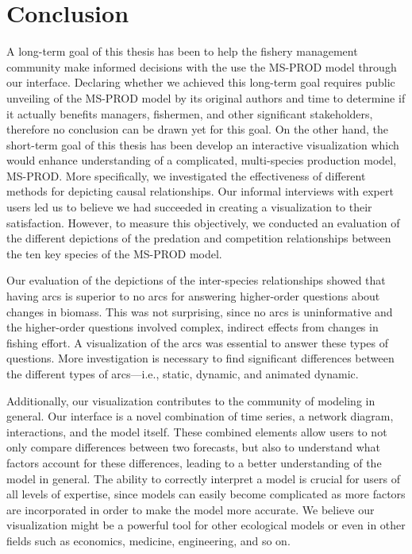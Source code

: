 \chapter{Conclusion}

A long-term goal of this thesis has been to help the fishery management community make informed decisions with the use the MS-PROD model through our interface.  Declaring whether we achieved this long-term goal requires public unveiling of the MS-PROD model by its original authors and time to determine if it actually benefits managers, fishermen, and other significant stakeholders, therefore no conclusion can be drawn yet for this goal.  On the other hand, the short-term goal of this thesis has been develop an interactive visualization which would enhance understanding of a complicated, multi-species production model, MS-PROD.  More specifically, we investigated the effectiveness of different methods for depicting causal relationships.  Our informal interviews with expert users led us to believe we had succeeded in creating a visualization to their satisfaction.  However, to measure this objectively, we conducted an evaluation of the different depictions of the predation and competition relationships between the ten key species of the MS-PROD model.

Our evaluation of the depictions of the inter-species relationships showed that having arcs is superior to no arcs for answering higher-order questions about changes in biomass.  This was not surprising, since no arcs is uninformative and the higher-order questions involved complex, indirect effects from changes in fishing effort.  A visualization of the arcs was essential to answer these types of questions.  More investigation is necessary to find significant differences between the different types of arcs---i.e., static, dynamic, and animated dynamic. 

Additionally, our visualization contributes to the community of modeling in general.  Our interface is a novel combination of time series, a network diagram, interactions, and the model itself.  These combined elements allow users to not only compare differences between two forecasts, but also to understand what factors account for these differences, leading to a better understanding of the model in general.  The ability to correctly interpret a model is crucial for users of all levels of expertise, since models can easily become complicated as more factors are incorporated in order to make the model more accurate.  We believe our visualization might be a powerful tool for other ecological models or even in other fields such as economics, medicine, engineering, and so on.

